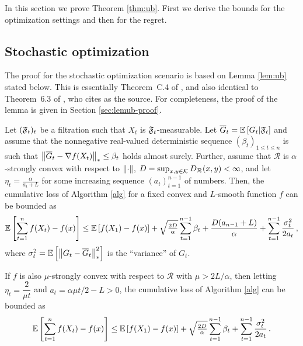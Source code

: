 
In this section we prove Theorem \ref{thm:ub}. First we derive the bounds for the optimization settings and then for the regret. 

\subsection{Stochastic optimization}

The proof for the stochastic optimization scenario is based on Lemma \ref{lem:ub} stated below.
This is essentially Theorem~C.4 of \citet{MahdaviPhd:2014}, and also identical to Theorem~6.3 of \citet{Bu:Convex14}, who cites \citet{Dekel:minibatch12} as the source. For completeness, the proof of the lemma is given in Section \ref{sec:lemub-proof}.
\begin{lemma}
\label{lem:ub}
Let $({\mathfrak{F}}_t)_{t}$ be a filtration such that $X_t$ is ${{\mathfrak{F}}}_t$-measurable.
Let $\overline G_t = \mathbb{E}\left[G_t|{{\mathfrak{F}}}_t\right]$
and assume that the nonnegative real-valued deterministic sequence $(\beta_t)_{1\le t\le n}$ is such that
$\left\|\overline G_t - \nabla {f}(X_t)\right\|_* \le \beta_t$ holds almost surely.
Further, assume that $\mathcal{R}$ is $\alpha$-strongly convex with respect to $\left\|\cdot\right\|$, $D=\sup_{x,y\in \mathcal{K}} D_{\mathcal{R}}(x,y) < \infty$,  and let $\eta_t = \frac{\alpha}{a_t+L}$ for some increasing
sequence $(a_t)_{t=1}^{n-1}$ of numbers. Then, the cumulative loss of Algorithm \ref{alg} for a fixed convex and $L$-smooth  function $f$ can be bounded as
\begin{align*}
\mathbb{E}\left[ \sum_{t=1}^n {f}(X_t) - {f}(x) \right]
\le 	 \mathbb{E}\left[{f}(X_1)-{f}(x)\right]+
  \sqrt{\tfrac{2D}{\alpha}} \sum_{t=1}^{n-1} \beta_t
 +\frac{D(a_{n-1}+L)}{\alpha} +
	  \sum_{t=1}^{n-1}\frac{\sigma_t^2}{2a_t}\,,
\end{align*}
where $\sigma_t^2 = \mathbb{E}\left[ \left\|G_t-\overline G_t\right\|_*^2\right]$ is the ``variance'' of $G_t$.

If ${{f}}$ is also $\mu$-strongly convex with respect to $\mathcal{R}$ with $\mu > 2L/\alpha$, then letting $\eta_t = \dfrac{2}{\mu t}$ and $a_t = \alpha \mu t/2-L > 0$, the cumulative loss of  Algorithm \ref{alg} can be bounded as
\begin{align*}
 \mathbb{E}\left[ \sum_{t=1}^n {f}(X_t) - {f}(x) \right]
\le 	 \mathbb{E}\left[{f}(X_1)-{f}(x)\right]+
 \sqrt{\tfrac{2D}{\alpha}} \sum_{t=1}^{n-1} \beta_t
 +\sum_{t=1}^{n-1}\frac{\sigma_t^2}{2a_t}\,.
\end{align*}
\end{lemma}

